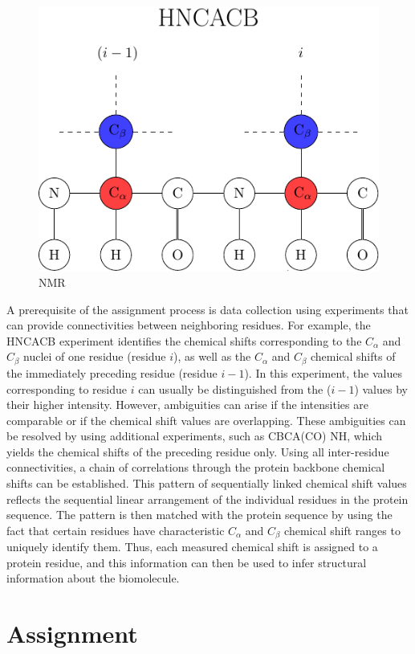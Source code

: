 \documentclass[12pt, letter]{article}
\begin{document}
\begin{figure}[H]
\begin{center}
\includegraphics[width=.6\textwidth]{diagram}
\end{center}
\caption{NMR} %
\label{fig:nmr}
\end{figure}
A prerequisite of the assignment process is data collection using experiments that can provide connectivities between neighboring residues. For example, the HNCACB experiment identifies the chemical shifts corresponding to the $C_\alpha$ and $C_{\beta}$ nuclei of one residue (residue $i$), as well as the $C_\alpha$ and $C_{\beta}$ chemical shifts of the immediately preceding residue (residue $i -1$). In this experiment, the values corresponding to residue $i$ can usually be distinguished from the ($i -1$) values by their higher intensity. However, ambiguities can arise if the intensities are comparable or if the chemical shift values are overlapping. These ambiguities can be resolved by using additional experiments, such as CBCA(CO) NH, which yields the chemical shifts of the preceding residue only. Using all inter-residue connectivities, a chain of correlations through the protein backbone chemical shifts can be established.  This pattern of sequentially linked chemical shift values reflects the sequential linear arrangement of the individual residues in the protein sequence. The pattern is then matched with the protein sequence by using the fact that certain residues have characteristic $C_\alpha$ and $C_{\beta}$ chemical shift ranges to uniquely identify them. Thus, each measured chemical shift is assigned to a protein residue, and this information can then be used to infer structural information about the biomolecule.

\section{Assignment} %
\label{sec:method}
\end{document}
